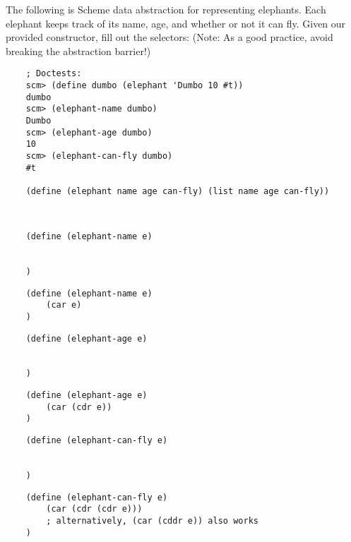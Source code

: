 \begin{blocksection}
    \question The following is Scheme data abstraction for representing elephants.
    Each elephant keeps track of its name, age, and whether or not it can fly. Given
    our provided constructor, fill out the selectors:
    (Note: As a good practice, avoid breaking the abstraction barrier!)
    \begin{lstlisting}
    ; Doctests:
    scm> (define dumbo (elephant 'Dumbo 10 #t))
    dumbo
    scm> (elephant-name dumbo)
    Dumbo
    scm> (elephant-age dumbo)
    10
    scm> (elephant-can-fly dumbo)
    #t
    
    (define (elephant name age can-fly) (list name age can-fly))
    
    
    \end{lstlisting}
    \begin{lstlisting}
    (define (elephant-name e)
        
    
    )
    \end{lstlisting}
    \begin{solution}[1in]
    \begin{lstlisting}
    (define (elephant-name e)
        (car e)
    )
    \end{lstlisting}
    \end{solution}
    \begin{lstlisting}
    (define (elephant-age e)
    
    
    )
    \end{lstlisting}
    \begin{solution}[1in]
    \begin{lstlisting}
    (define (elephant-age e)
        (car (cdr e))
    )
    \end{lstlisting}
    \end{solution}
    \begin{lstlisting}
    (define (elephant-can-fly e)
    
    
    )
    \end{lstlisting}
    \begin{solution}[1in]
    \begin{lstlisting}
    (define (elephant-can-fly e)
        (car (cdr (cdr e))) 
        ; alternatively, (car (cddr e)) also works
    )
    \end{lstlisting}
    \end{solution}
    \end{blocksection}
    
    

